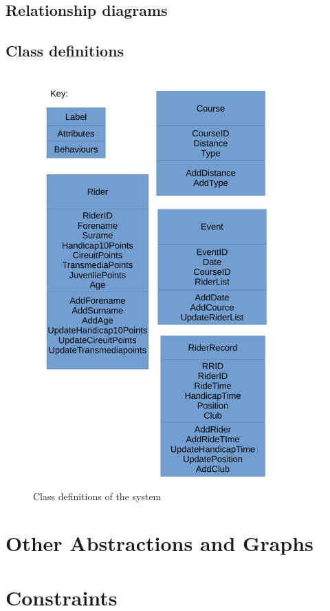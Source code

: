 \subsection{Relationship diagrams}

\subsection{Class definitions}
\begin{figure}[H]
	\includegraphics[width=\textwidth]{./Class.pdf}
	\caption{Class definitions of the system}
\end{figure}
\section{Other Abstractions and Graphs}

\section{Constraints}

